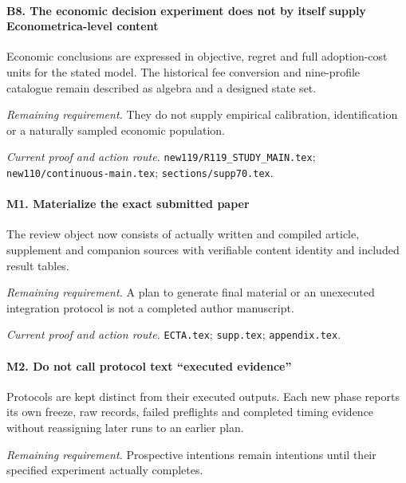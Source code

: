 \paragraph{B8. The economic decision experiment does not by itself supply Econometrica-level content}

Economic conclusions are expressed in objective, regret and full adoption-cost units for the stated model. The historical fee conversion and nine-profile catalogue remain described as algebra and a designed state set.

\par\emph{Remaining requirement.} They do not supply empirical calibration, identification or a naturally sampled economic population.

\par\emph{Current proof and action route.} \nolinkurl{new119/R119_STUDY_MAIN.tex}; \nolinkurl{new110/continuous-main.tex}; \nolinkurl{sections/supp70.tex}.

\paragraph{M1. Materialize the exact submitted paper}

The review object now consists of actually written and compiled article, supplement and companion sources with verifiable content identity and included result tables.

\par\emph{Remaining requirement.} A plan to generate final material or an unexecuted integration protocol is not a completed author manuscript.

\par\emph{Current proof and action route.} \nolinkurl{ECTA.tex}; \nolinkurl{supp.tex}; \nolinkurl{appendix.tex}.

\paragraph{M2. Do not call protocol text “executed evidence”}

Protocols are kept distinct from their executed outputs. Each new phase reports its own freeze, raw records, failed preflights and completed timing evidence without reassigning later runs to an earlier plan.

\par\emph{Remaining requirement.} Prospective intentions remain intentions until their specified experiment actually completes.

